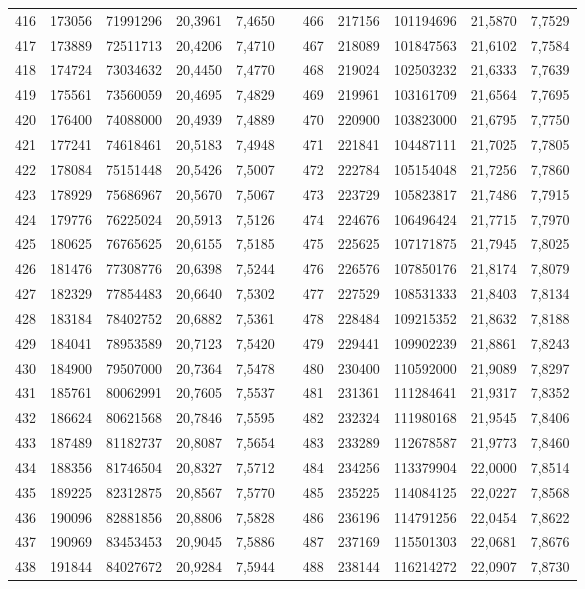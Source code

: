 \begin{longtable}{rrrrrrrrrrr}
416&173056&71991296&20,3961&7,4650&&466&217156&101194696&21,5870&7,7529\\
417&173889&72511713&20,4206&7,4710&&467&218089&101847563&21,6102&7,7584\\
418&174724&73034632&20,4450&7,4770&&468&219024&102503232&21,6333&7,7639\\
419&175561&73560059&20,4695&7,4829&&469&219961&103161709&21,6564&7,7695\\
420&176400&74088000&20,4939&7,4889&&470&220900&103823000&21,6795&7,7750\\
421&177241&74618461&20,5183&7,4948&&471&221841&104487111&21,7025&7,7805\\
422&178084&75151448&20,5426&7,5007&&472&222784&105154048&21,7256&7,7860\\
423&178929&75686967&20,5670&7,5067&&473&223729&105823817&21,7486&7,7915\\
424&179776&76225024&20,5913&7,5126&&474&224676&106496424&21,7715&7,7970\\
425&180625&76765625&20,6155&7,5185&&475&225625&107171875&21,7945&7,8025\\
426&181476&77308776&20,6398&7,5244&&476&226576&107850176&21,8174&7,8079\\
427&182329&77854483&20,6640&7,5302&&477&227529&108531333&21,8403&7,8134\\
428&183184&78402752&20,6882&7,5361&&478&228484&109215352&21,8632&7,8188\\
429&184041&78953589&20,7123&7,5420&&479&229441&109902239&21,8861&7,8243\\
430&184900&79507000&20,7364&7,5478&&480&230400&110592000&21,9089&7,8297\\
431&185761&80062991&20,7605&7,5537&&481&231361&111284641&21,9317&7,8352\\
432&186624&80621568&20,7846&7,5595&&482&232324&111980168&21,9545&7,8406\\
433&187489&81182737&20,8087&7,5654&&483&233289&112678587&21,9773&7,8460\\
434&188356&81746504&20,8327&7,5712&&484&234256&113379904&22,0000&7,8514\\
435&189225&82312875&20,8567&7,5770&&485&235225&114084125&22,0227&7,8568\\
436&190096&82881856&20,8806&7,5828&&486&236196&114791256&22,0454&7,8622\\
437&190969&83453453&20,9045&7,5886&&487&237169&115501303&22,0681&7,8676\\
438&191844&84027672&20,9284&7,5944&&488&238144&116214272&22,0907&7,8730\\

\end{longtable}
